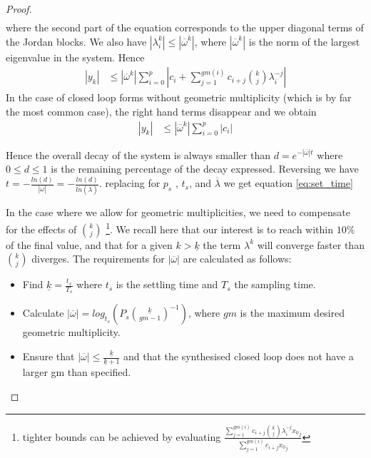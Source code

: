 \documentclass[sigconf]{llncs}
\newcommand{\mat}[1]{{#1}}
\renewcommand{\vec}[1]{{#1}}
\begin{document}
\begin{proof}
\begin{align*}
\end{align*}
where the second  part of the equation corresponds to the upper diagonal
terms of the Jordan blocks.  We also have $|\lambda_i^k|\leq
|\overline{\omega}^k|$, where $|\overline{\omega}^k|$ is the norm of the largest
eigenvalue in the system. Hence
%
\begin{align*}
|y_k|&\leq |\overline{\omega}^k|\sum_{i=0}^p \left|c_i + \sum\limits_{j=1}^{gm(i)}c_{i+j}\binom{k}{j} \lambda_i^{-j}\right|
\end{align*}
%
In the case of closed loop forms without geometric multiplicity (which is by far the most common case),
the right hand terms disappear and we obtain
%
\begin{align*}
|y_k|&\leq |\overline{\omega}^k|\sum_{i=0}^p |c_i|
\end{align*}

Hence the overall decay of the system is always smaller
than $d=e^{-|\overline{\omega}| t}$ where $0\leq d\leq 1$ is the remaining
percentage of the decay expressed.  Reversing we have
$t=-\frac{ln(d)}{|\overline{\omega}|}=-\frac{ln(d)}{ln(\overline{\lambda})}$. 
replacing for $p_s$ , $t_s$, and $\overline{\lambda}$ we get equation
\eqref{eq:set_time}
%

In the case where we allow for geometric multiplicities, we need to compensate for
the effects of $\binom{k}{j}$ \footnote{tighter bounds can be achieved by evaluating $\frac{\sum\limits_{j=1}^{gm(i)}c_{i+j}\binom{k}{j} \lambda_i^{-j}{\vec{x}_0}_j}{\sum\limits_{j=1}^{gm(i)}c_{i+j}{\vec{x}_0}_j}$}. We recall here that our interest is to reach
within $10\%$ of the final value, and that for a given $k>\underline{k}$ the
term $\lambda^k$ will converge faster than $\binom{k}{j}$ diverges.
The requirements for $|\overline{\omega}|$ are calculated as follows:
\begin{itemize}
\item Find $\underline{k}=\frac{t_s}{T_s}$ where $t_s$ is the settling time and $T_s$ the sampling time.
\item Calculate $|\overline{\omega}|=log_{t_s}\left(P_s\binom{\underline{k}}{gm-1}^{-1}\right)$,
where $gm$ is the maximum desired geometric multiplicity.
\item Ensure that $|\overline{\omega}| \leq \frac{\underline{k}}{\underline{k}+1}$ and that the
synthesised closed loop does not have a larger gm than specified.
\end{itemize}
\end{proof}
\end{document}
